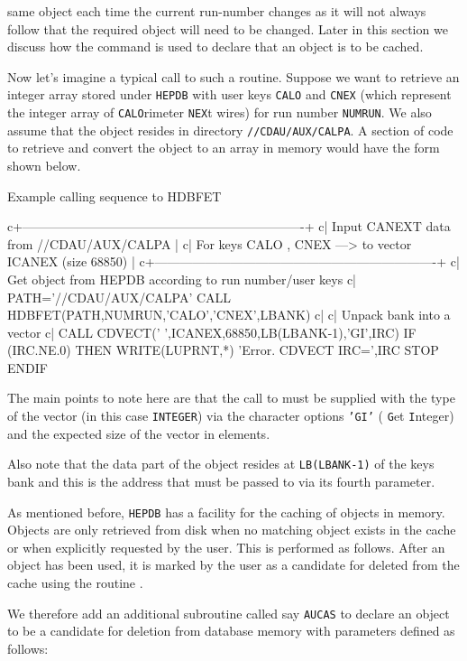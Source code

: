 same object each time the current run-number changes as it will not always follow that the
required object will need to be changed. Later in this section we discuss how the command
 is used to declare that an object is to be cached.
\par
Now let's imagine a typical call to such a routine. Suppose we want to retrieve an integer array
stored under {\tt HEPDB} with user keys {\tt CALO} and {\tt CNEX} (which represent the integer
array of {\tt CALO}rimeter {\tt NEX}t wires) for run number {\tt NUMRUN}. We also assume that the
object resides in directory {\tt //CDAU/AUX/CALPA}. A section of code to retrieve and convert
the object to an array in memory would have the form shown below.

%
\begin{XMPt}{Example calling sequence to HDBFET}

c+-------------------------------------------------------------------+
c|  Input CANEXT data from //CDAU/AUX/CALPA                          |
c|  For keys CALO , CNEX ---> to vector ICANEX (size 68850)          |
c+-------------------------------------------------------------------+
c|  Get object from HEPDB according to run number/user keys
c|
      PATH='//CDAU/AUX/CALPA'
      CALL HDBFET(PATH,NUMRUN,'CALO','CNEX',LBANK)
c|
c|     Unpack bank into a vector
c|
      CALL CDVECT(' ',ICANEX,68850,LB(LBANK-1),'GI',IRC)
      IF (IRC.NE.0) THEN
         WRITE(LUPRNT,*) 'Error. CDVECT IRC=',IRC
         STOP
      ENDIF

\end{XMPt}
The main points to note here are that the call to  must be
supplied with the type of the vector (in this case {\tt INTEGER})
via the character options {\tt 'GI'}
( {\tt G}et {\tt I}nteger) and the expected size of the vector in elements.

Also note that the data part of the object resides at {\tt LB(LBANK-1)} of the keys bank and
this is the address that must be passed to  via its fourth parameter.

As mentioned before, {\tt HEPDB} has a facility for the caching of objects in memory.
Objects are only retrieved from disk when no matching object exists in the cache
or when explicitly requested by the user.
This is performed as follows. After an object has been used, it is marked by
the user as a candidate for deleted from the cache using the routine .

We therefore add an additional subroutine called say {\tt AUCAS} to declare an
object to be a candidate for deletion from database memory with parameters defined
as follows:

